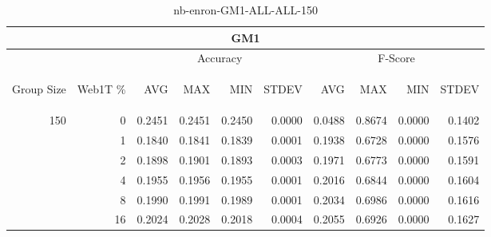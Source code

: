 \begin{center}
\begin{table}[htbp]
\begin{tabular}{ | r | r | r | r | r | r | r | r | r | r |}
\hline
\multicolumn{10}{|c|}{GM1}\\
\hline
 & & \multicolumn{4}{|c|}{Accuracy} & \multicolumn{4}{|c|}{F-Score}\\ \cline{3-10}
\begin{sideways}Group Size\end{sideways} & \begin{sideways}Web1T \%\end{sideways} & \begin{sideways}AVG\end{sideways} & \begin{sideways}MAX\end{sideways} & \begin{sideways}MIN\end{sideways} & \begin{sideways}STDEV\end{sideways} & \begin{sideways}AVG\end{sideways} & \begin{sideways}MAX\end{sideways} & \begin{sideways}MIN\end{sideways} & \begin{sideways}STDEV\end{sideways}\\
\hline
\multirow{5}{*}{150}
 & 0 & 0.2451 & 0.2451 & 0.2450 & 0.0000 & 0.0488 & 0.8674 & 0.0000 & 0.1402\\ \cline{2-10}
 & 1 & 0.1840 & 0.1841 & 0.1839 & 0.0001 & 0.1938 & 0.6728 & 0.0000 & 0.1576\\ \cline{2-10}
 & 2 & 0.1898 & 0.1901 & 0.1893 & 0.0003 & 0.1971 & 0.6773 & 0.0000 & 0.1591\\ \cline{2-10}
 & 4 & 0.1955 & 0.1956 & 0.1955 & 0.0001 & 0.2016 & 0.6844 & 0.0000 & 0.1604\\ \cline{2-10}
 & 8 & 0.1990 & 0.1991 & 0.1989 & 0.0001 & 0.2034 & 0.6986 & 0.0000 & 0.1616\\ \cline{2-10}
 & 16 & 0.2024 & 0.2028 & 0.2018 & 0.0004 & 0.2055 & 0.6926 & 0.0000 & 0.1627\\ \cline{2-10}
\hline
\end{tabular}
\caption{nb-enron-GM1-ALL-ALL-150}
\label{table:nb-enron-GM1-ALL-ALL-150}
\end{table}
\end{center}

